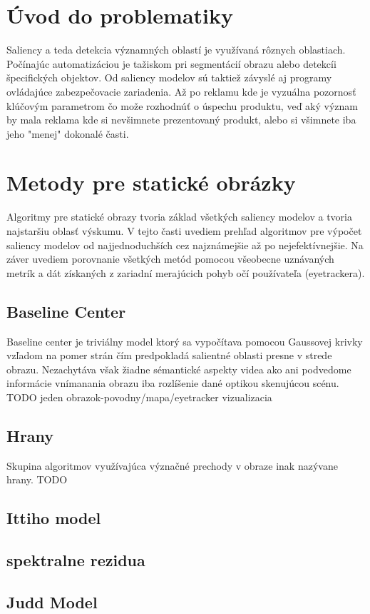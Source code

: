 \section{Úvod do problematiky}
Saliency a teda detekcia významných oblastí je využívaná rôznych oblastiach. Počínajúc automatizáciou je tažiskom pri segmentácií obrazu alebo detekcíi špecifických objektov. Od saliency modelov sú taktiež závyslé aj programy ovládajúce zabezpečovacie zariadenia. Až po reklamu kde je vyzuálna pozornosť klúčovým parametrom čo može rozhodnúť o úspechu produktu, veď aký význam by mala reklama kde si nevšimnete prezentovaný produkt, alebo si všimnete iba jeho "menej" dokonalé časti.
\section{Metody pre statické obrázky}
Algoritmy pre statické obrazy tvoria základ všetkých saliency modelov a tvoria najstaršiu oblasť výskumu. V tejto časti uvediem prehľad algoritmov pre výpočet saliency modelov od najjednoduchších cez najznámejšie až po nejefektívnejšie. Na záver uvediem porovnanie všetkých metód pomocou všeobecne uznávaných metrík a dát získaných z zariadní merajúcich pohyb očí používateľa (eyetrackera).
\subsection{Baseline Center}\label{section:caseline-center}
Baseline center je triviálny model ktorý sa vypočítava pomocou Gaussovej krivky vzľadom na pomer strán čím predpokladá salientné oblasti presne v strede obrazu. Nezachytáva však žiadne sémantické aspekty videa ako ani podvedome informácie vnímanania obrazu iba rozlíšenie dané optikou skenujúcou scénu.
TODO jeden obrazok-povodny/mapa/eyetracker vizualizacia
\subsection{Hrany}
Skupina algoritmov využívajúca význačné prechody v obraze inak nazývane hrany.
TODO
\subsection{Ittiho model}
\subsection{spektralne rezidua}
\subsection{Judd Model}
